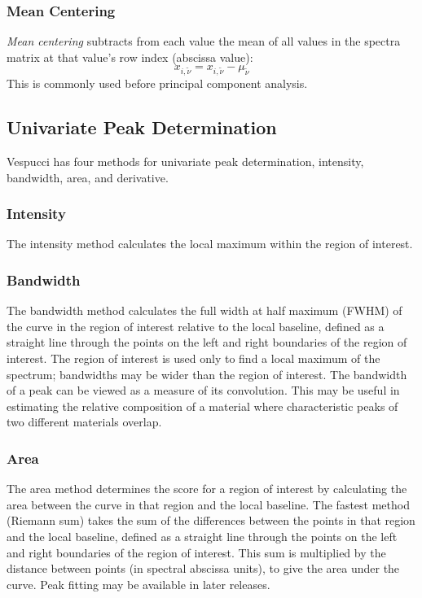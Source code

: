 \documentclass[12pt]{achemso} %
\begin{document}
\subsubsection{Mean Centering}
\emph{Mean centering} subtracts from each value the mean of all values in the spectra 
matrix at that value's row index (abscissa value):
\[x_{i, \tilde{\nu}} = x_{i, \tilde{\nu}} - \mu_{\tilde{\nu}} \]
This is commonly used before principal component analysis.

\subsection{Univariate Peak Determination} Vespucci has four methods for
univariate peak determination, intensity, bandwidth, area, and derivative.

\subsubsection{Intensity} The intensity method calculates the local maximum
within the region of interest.

\subsubsection{Bandwidth} The bandwidth method calculates the full width at half
maximum (FWHM) of the curve in the region of interest relative to the local
baseline, defined as a straight line through the points on the left and right
boundaries of the region of interest. The region of interest is used only to
find a local maximum of the spectrum; bandwidths may be wider than the region of
interest. The bandwidth of a peak can be viewed as a measure of its convolution.
This may be useful in estimating the relative composition of a material where
characteristic peaks of two different materials overlap.

\subsubsection{Area} The area method determines the score for a region of
interest by calculating the area between the curve in that region and the local
baseline. The fastest method (Riemann sum) takes the sum of the differences
between the points in that region and the local baseline, defined as a straight
line through the points on the left and right boundaries of the region of
interest. This sum is multiplied by the distance between points (in spectral
abscissa units), to give the area under the curve. Peak fitting may be available
in later releases.
\end{document}

